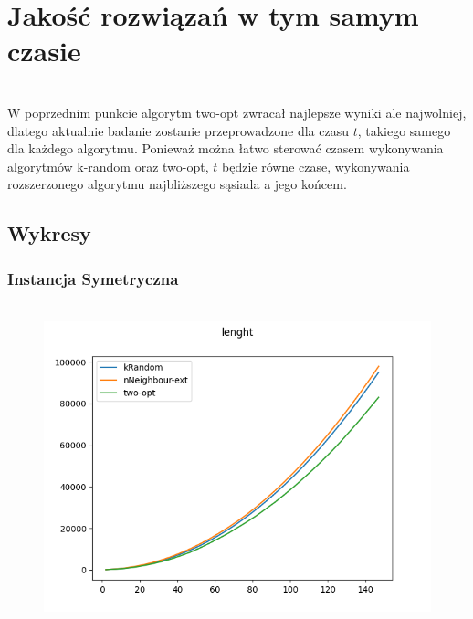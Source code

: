 \documentclass[11pt]{article}
\begin{document}
\section{Jakość rozwiązań w tym samym czasie }
\\W poprzednim punkcie algorytm two-opt zwracał najlepsze wyniki ale najwolniej, dlatego aktualnie badanie zostanie przeprowadzone dla czasu $t$, takiego samego dla każdego algorytmu. Ponieważ można łatwo sterować czasem wykonywania algorytmów k-random oraz two-opt, $t$ będzie równe czase, wykonywania rozszerzonego algorytmu najbliższego sąsiada a jego końcem.
\subsection{Wykresy }
\subsubsection{Instancja Symetryczna }
            \begin{center}
            \begin{figure}[H]

                \\ \includegraphics[scale=0.6]{images/lenght_sym_time.png}\

            \end{figure}
            \end{center}
\end{document}
